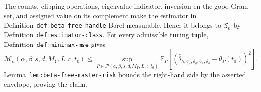 The counts, clipping operations, eigenvalue indicator, inversion on the good-Gram set, and assigned value on its complement make the estimator in Definition~\texttt{def:beta-free-handle} Borel measurable. Hence it belongs to \(\mathfrak T_n\) by Definition~\texttt{def:estimator-class}. For every admissible tuning tuple, Definition~\texttt{def:minimax-mse} gives
\[
\mathcal M_n(\alpha,\beta,s,d,M_Y,L,c,t_0)
\le
\sup_{P\in\mathcal P(\alpha,\beta,s,d,M_Y,L,c,t_0)}
\mathbb E_P\left[(\widehat\theta_{h,b_\mu,\delta_\mu,b_\pi,\delta_\pi}-\theta_P(t_0))^2\right].
\]
Lemma~\texttt{lem:beta-free-master-risk} bounds the right-hand side by the asserted envelope, proving the claim.